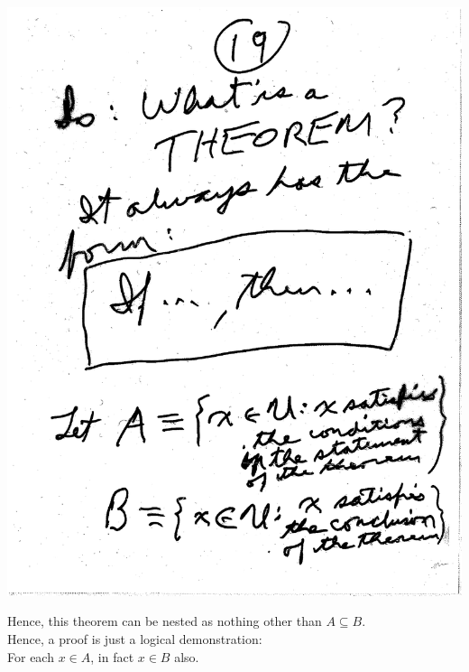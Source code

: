 \documentclass[10pt,a4paper]{article}
\begin{document}
\includegraphics[scale=.5]{Pages/ST_19}

\newpage

\noindent Hence, this theorem can be nested as nothing other than $A \subseteq B $.
\\ \indent Hence, a proof is just a logical demonstration:
\\ \indent For each $x \in A$, in fact $x \in B$ also.
\end{document}

